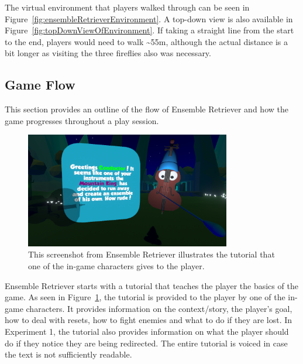The virtual environment that players walked through can be seen in Figure~\ref{fig:ensembleRetrieverEnvironment}. A top-down view is also available in Figure~\ref{fig:topDownViewOfEnvironment}. If taking a straight line from the start to the end, players would need to walk \textasciitilde55m, although the actual distance is a bit longer as visiting the three fireflies also was necessary. 

\subsection{Game Flow}
This section provides an outline of the flow of Ensemble Retriever and how the game progresses throughout a play session. 

\begin{figure}[tbph]
    \centering
    \includegraphics[width=0.8\textwidth]{figures/screenshots/Tutorial.png}
    \caption[Screenshot of the Tutorial in Ensemble Retriever]{This screenshot from Ensemble Retriever illustrates the tutorial that one of the in-game characters gives to the player.}
    \label{fig:tutorial}
\end{figure}

Ensemble Retriever starts with a tutorial that teaches the player the basics of the game. As seen in Figure~\ref{fig:tutorial}, the tutorial is provided to the player by one of the in-game characters. It provides information on the context/story, the player's goal, how to deal with resets, how to fight enemies and what to do if they are lost. In Experiment 1, the tutorial also provides information on what the player should do if they notice they are being redirected. The entire tutorial is voiced in case the text is not sufficiently readable.


